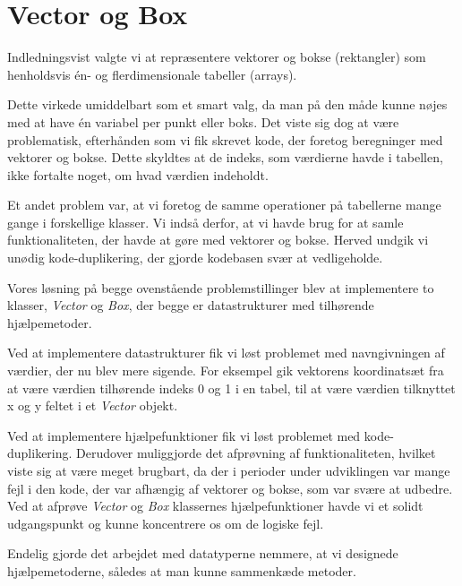 \section{Vector og Box}

Indledningsvist valgte vi at repræsentere vektorer og bokse (rektangler) som henholdsvis én- og flerdimensionale tabeller (arrays).
	
Dette virkede umiddelbart som et smart valg, da man på den måde kunne nøjes med at have én variabel per punkt eller boks. Det viste sig dog at være problematisk, efterhånden som vi fik skrevet kode, der foretog beregninger med vektorer og bokse. Dette skyldtes at de indeks, som værdierne havde i tabellen, ikke fortalte noget, om hvad værdien indeholdt.

Et andet problem var, at vi foretog de samme operationer på tabellerne mange gange i forskellige klasser. Vi indså derfor, at vi havde brug for at samle funktionaliteten, der havde at gøre med vektorer og bokse. Herved undgik vi unødig kode-duplikering, der gjorde kodebasen svær at vedligeholde.

Vores løsning på begge ovenstående problemstillinger blev at implementere to klasser, \emph{Vector} og \emph{Box}, der begge er datastrukturer med tilhørende hjælpemetoder.

Ved at implementere datastrukturer fik vi løst problemet med navngivningen af værdier, der nu blev mere sigende. For eksempel gik vektorens koordinatsæt fra at være værdien tilhørende indeks 0 og 1 i en tabel, til at være værdien tilknyttet x og y feltet i et \emph{Vector} objekt.

Ved at implementere hjælpefunktioner fik vi løst problemet med kode-duplikering. Derudover muliggjorde det afprøvning af funktionaliteten, hvilket viste sig at være meget brugbart, da der i perioder under udviklingen var mange fejl i den kode, der var afhængig af vektorer og bokse, som var svære at udbedre. Ved at afprøve \emph{Vector} og \emph{Box} klassernes hjælpefunktioner havde vi et solidt udgangspunkt og kunne koncentrere os om de logiske fejl.

Endelig gjorde det arbejdet med datatyperne nemmere, at vi designede hjælpemetoderne, således at man kunne sammenkæde metoder.